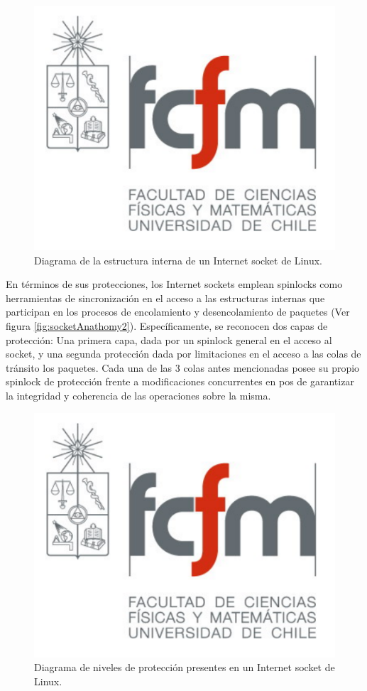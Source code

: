 \begin{figure}[!h]
	\centering
	\includegraphics[scale=0.25]{imagenes/fcfm}
	\caption{Diagrama de la estructura interna de un Internet socket de Linux.}
	\label{fig:socketAnathomy}
\end{figure}

En términos de sus protecciones, los Internet sockets emplean spinlocks como herramientas de sincronización en el acceso a las estructuras internas que participan en los procesos de encolamiento y desencolamiento de paquetes (Ver figura \ref{fig:socketAnathomy2}). Específicamente, se reconocen dos capas de protección: Una primera capa, dada por un spinlock general en el acceso al socket, y una segunda protección dada por limitaciones en el acceso a las colas de tránsito los paquetes. Cada una de las 3 colas antes mencionadas posee su propio spinlock de protección frente a modificaciones concurrentes en pos de garantizar la integridad y coherencia de las operaciones sobre la misma.

\begin{figure}[!h]
	\centering
	\includegraphics[scale=0.25]{imagenes/fcfm}
	\caption{Diagrama de niveles de protección presentes en un Internet socket de Linux.}
	\label{fig:socketAnathomy}
\end{figure}

